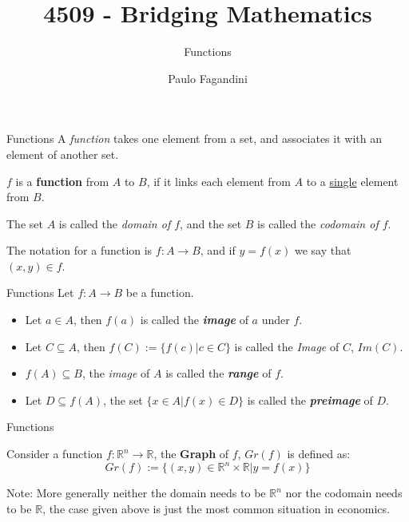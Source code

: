 \documentclass[aspectratio=169, handout]{beamer}
\title[]{4509 - Bridging Mathematics}
\subtitle{Functions}
\author[P. Fagandini]{Paulo Fagandini}
\institute[]{}
\date{}
\begin{document}
\begin{frame}{Functions}
     A \emph{function} takes one element from a set, and associates it with an element of another set.
     
     \begin{definition}
        $f$ is a \textbf{function} from $A$ to $B$, if it links each element from $A$ to a \underline{single} element from $B$.
        
        The set $A$ is called the \emph{domain of $f$}, and the set $B$ is called the \emph{codomain of $f$}.
     \end{definition}
     
     The notation for a function is $f:A\rightarrow B$, and if $y=f(x)$ we say that $(x,y)\in f$.
     
\end{frame}

\begin{frame}{Functions}
    Let $f:A\rightarrow B$ be a function.
    \begin{itemize}
        \item Let $a\in A$, then $f(a)$ is called the \textit{\textbf{image}} of $a$ under $f$.
        \item Let $C\subseteq A$, then $f(C):=\{f(c)|c\in C\}$ is called the \textit{Image} of $C$, $Im(C)$.
        \item $f(A)\subseteq B$, the \textit{image} of $A$ is called the \textit{\textbf{range}} of $f$.
        \item Let $D\subseteq f(A)$, the set $\{x\in A | f(x) \in D\}$ is called the \textit{\textbf{preimage}} of $D$.
    \end{itemize}
\end{frame}

\begin{frame}{Functions}
    \begin{definition}
        Consider a function $f:\mathds{R}^n\rightarrow\mathds{R}$, the \textbf{Graph} of $f$, $Gr(f)$ is defined as:
        $$Gr(f):=\{(x,y)\in \mathds{R}^n\times\mathds{R}|y=f(x)\}$$
    \end{definition}
    
    \pause
    
    Note: More generally neither the domain needs to be $\mathds{R}^n$ nor the codomain needs to be $\mathds{R}$, the case given above is just the most common situation in economics.
\end{frame}
\end{document}
